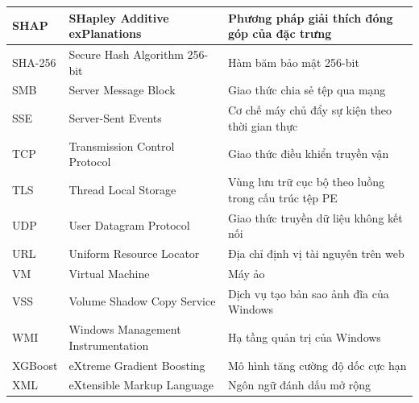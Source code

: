 \documentclass[../DoAn.tex]{subfiles}
\begin{document}
\begin{longtable}{|l|p{5.2cm}|p{6cm}|}
\hline
SHAP & SHapley Additive exPlanations & Phương pháp giải thích đóng góp của đặc trưng \\
\hline
SHA-256 & Secure Hash Algorithm 256-bit & Hàm băm bảo mật 256-bit \\
\hline
SMB & Server Message Block & Giao thức chia sẻ tệp qua mạng \\
\hline
SSE & Server-Sent Events & Cơ chế máy chủ đẩy sự kiện theo thời gian thực \\
\hline
TCP & Transmission Control Protocol & Giao thức điều khiển truyền vận \\
\hline
TLS & Thread Local Storage & Vùng lưu trữ cục bộ theo luồng trong cấu trúc tệp PE \\
\hline
UDP & User Datagram Protocol & Giao thức truyền dữ liệu không kết nối \\
\hline
URL & Uniform Resource Locator & Địa chỉ định vị tài nguyên trên web \\
\hline
VM & Virtual Machine & Máy ảo \\
\hline
VSS & Volume Shadow Copy Service & Dịch vụ tạo bản sao ảnh đĩa của Windows \\
\hline
WMI & Windows Management Instrumentation & Hạ tầng quản trị của Windows \\
\hline
XGBoost & eXtreme Gradient Boosting & Mô hình tăng cường độ dốc cực hạn \\
\hline
XML & eXtensible Markup Language & Ngôn ngữ đánh dấu mở rộng \\
\hline
\end{longtable}
\end{document}
